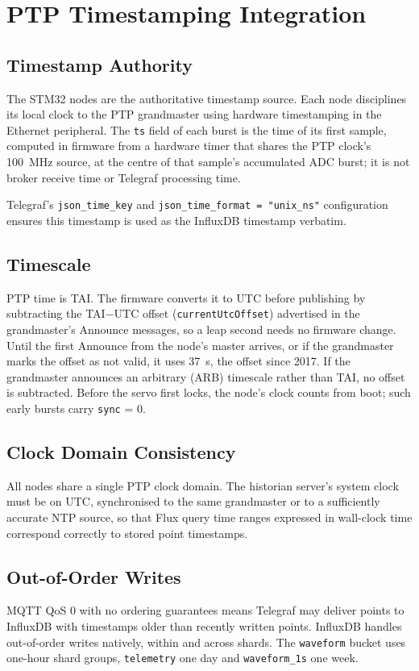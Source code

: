 \section{PTP Timestamping Integration}
\subsection{Timestamp Authority}
The STM32 nodes are the authoritative timestamp source. Each node disciplines its local clock to the PTP grandmaster using hardware timestamping in the Ethernet peripheral. The \texttt{ts} field of each burst is the time of its first sample, computed in firmware from a hardware timer that shares the PTP clock's 100~MHz source, at the centre of that sample's accumulated ADC burst; it is not broker receive time or Telegraf processing time.

Telegraf's \texttt{json\_time\_key} and \texttt{json\_time\_format = "unix\_ns"} configuration ensures this timestamp is used as the InfluxDB timestamp verbatim.

\subsection{Timescale}
PTP time is TAI. The firmware converts it to UTC before publishing by subtracting the TAI$-$UTC offset (\texttt{currentUtcOffset}) advertised in the grandmaster's Announce messages, so a leap second needs no firmware change. Until the first Announce from the node's master arrives, or if the grandmaster marks the offset as not valid, it uses 37~s, the offset since 2017. If the grandmaster announces an arbitrary (ARB) timescale rather than TAI, no offset is subtracted. Before the servo first locks, the node's clock counts from boot; such early bursts carry \texttt{sync} = 0.

\subsection{Clock Domain Consistency}
All nodes share a single PTP clock domain. The historian server's system clock must be on UTC, synchronised to the same grandmaster or to a sufficiently accurate NTP source, so that Flux query time ranges expressed in wall-clock time correspond correctly to stored point timestamps.

\subsection{Out-of-Order Writes}
MQTT QoS 0 with no ordering guarantees means Telegraf may deliver points to InfluxDB with timestamps older than recently written points. InfluxDB handles out-of-order writes natively, within and across shards. The \texttt{waveform} bucket uses one-hour shard groups, \texttt{telemetry} one day and \texttt{waveform\_1s} one week.

